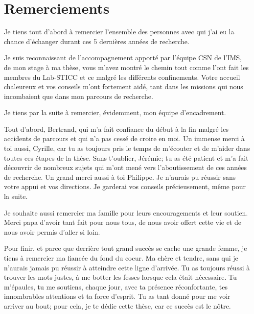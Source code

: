 \documentclass[../main.tex]{subfiles}
\begin{document}
\chapter*{Remerciements}


Je tiens tout d’abord à remercier l’ensemble des personnes avec qui j’ai eu la chance d’échanger durant ces 5 dernières années de recherche. 

Je suis reconnaissant de l’accompagnement apporté par l’équipe CSN de l’IMS, de mon stage à ma thèse, vous m’avez montré le chemin tout comme l’ont fait les membres du Lab-STICC et ce malgré les différents confinements. Votre accueil chaleureux et vos conseils m’ont fortement aidé, tant dans les missions qui nous incombaient que dans mon parcours de recherche. 

Je tiens par la suite à remercier, évidemment, mon équipe d’encadrement. 

Tout d’abord, Bertrand, qui m’a fait confiance du début à la fin malgré les accidents de parcours et qui n’a pas cessé de croire en moi. Un immense merci à toi aussi, Cyrille, car tu as toujours pris le temps de m’écouter et de m’aider dans toutes ces étapes de la thèse. Sans t’oublier, Jérémie; tu as été patient et m’a fait découvrir de nombreux sujets qui m’ont mené vers l’aboutissement de ces années de recherche. Un grand merci aussi à toi Philippe. Je n’aurais pu réussir sans votre appui et vos directions. Je garderai vos conseils précieusement, même pour la suite. 

Je souhaite aussi remercier ma famille pour leurs encouragements et leur soutien. Merci papa d’avoir tant fait pour nous tous, de nous avoir offert cette vie et de nous avoir permis d’aller si loin. 

Pour finir, et parce que derrière tout grand succès se cache une grande femme, je tiens à remercier ma fiancée du fond du coeur. Ma chère et tendre, sans qui je n’aurais jamais pu réussir à atteindre cette ligne d’arrivée. Tu as toujours réussi à trouver les mots justes, à me botter les fesses lorsque cela était nécessaire. Tu m’épaules, tu me soutiens, chaque jour, avec ta présence réconfortante, tes innombrables attentions et ta force d’esprit. Tu as tant donné pour me voir arriver au bout; pour cela, je te dédie cette thèse, car ce succès est le nôtre.
\end{document}
